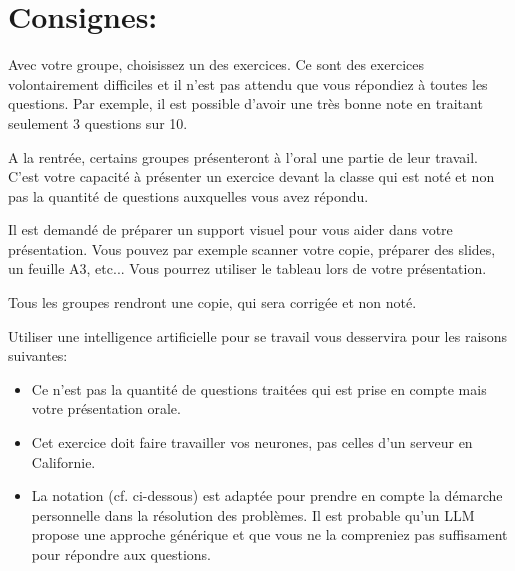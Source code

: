 \documentclass[a4paper,12pt, noSujetB]{article}
\date{Toussaint}
\begin{document}
    \section*{Consignes:}

    Avec votre groupe, choisissez un des exercices. Ce sont des exercices volontairement difficiles et il n'est pas attendu que vous répondiez à toutes les questions. Par exemple, il est possible d'avoir une très bonne note en traitant seulement 3 questions sur 10.

    \medskip
    A la rentrée, certains groupes présenteront à l'oral une partie de leur travail. C'est votre capacité à présenter un exercice devant la classe qui est noté et non pas la quantité de questions auxquelles vous avez répondu.

    \medskip
    Il est demandé de préparer un support visuel pour vous aider dans votre présentation. Vous pouvez par exemple scanner votre copie, préparer des slides, un feuille A3, etc... Vous pourrez utiliser le tableau lors de votre présentation.

    \medskip
    Tous les groupes rendront une copie, qui sera corrigée et non noté.

    \medskip
    Utiliser une intelligence artificielle pour se travail vous desservira pour les raisons suivantes:
        \begin{itemize}
            \item Ce n'est pas la quantité de questions traitées qui est prise en compte mais votre présentation orale.
            \item Cet exercice doit faire travailler vos neurones, pas celles d'un serveur en Californie.
            \item La notation (cf. ci-dessous) est adaptée pour prendre en compte la démarche personnelle dans la résolution des problèmes. Il est probable qu'un LLM propose une approche générique et que vous ne la compreniez pas suffisament pour répondre aux questions.
        \end{itemize}
\end{document}
